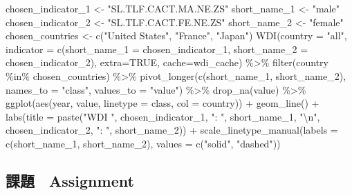 \documentclass[
]{bxjsbook}
\newenvironment{Shaded}{\begin{snugshade}}{\end{snugshade}}
\newcommand{\AttributeTok}[1]{\textcolor[rgb]{0.77,0.63,0.00}{#1}}
\newcommand{\ConstantTok}[1]{\textcolor[rgb]{0.00,0.00,0.00}{#1}}
\newcommand{\FunctionTok}[1]{\textcolor[rgb]{0.00,0.00,0.00}{#1}}
\newcommand{\NormalTok}[1]{#1}
\newcommand{\OtherTok}[1]{\textcolor[rgb]{0.56,0.35,0.01}{#1}}
\newcommand{\SpecialCharTok}[1]{\textcolor[rgb]{0.00,0.00,0.00}{#1}}
\newcommand{\StringTok}[1]{\textcolor[rgb]{0.31,0.60,0.02}{#1}}
\theoremstyle{definition}
\theoremstyle{definition}
\theoremstyle{definition}
\theoremstyle{definition}
\theoremstyle{remark}
\begin{document}
\begin{Shaded}
\begin{Highlighting}[]
\NormalTok{chosen\_indicator\_1 }\OtherTok{\textless{}{-}} \StringTok{"SL.TLF.CACT.MA.NE.ZS"}
\NormalTok{short\_name\_1 }\OtherTok{\textless{}{-}} \StringTok{"male"}
\NormalTok{chosen\_indicator\_2 }\OtherTok{\textless{}{-}} \StringTok{"SL.TLF.CACT.FE.NE.ZS"}
\NormalTok{short\_name\_2 }\OtherTok{\textless{}{-}} \StringTok{"female"}
\NormalTok{chosen\_countries }\OtherTok{\textless{}{-}} \FunctionTok{c}\NormalTok{(}\StringTok{"United States"}\NormalTok{, }\StringTok{"France"}\NormalTok{, }\StringTok{"Japan"}\NormalTok{)}
\FunctionTok{WDI}\NormalTok{(}\AttributeTok{country =} \StringTok{"all"}\NormalTok{, }\AttributeTok{indicator =} \FunctionTok{c}\NormalTok{(}\AttributeTok{short\_name\_1 =}\NormalTok{ chosen\_indicator\_1, }\AttributeTok{short\_name\_2 =}\NormalTok{ chosen\_indicator\_2), }\AttributeTok{extra=}\ConstantTok{TRUE}\NormalTok{, }\AttributeTok{cache=}\NormalTok{wdi\_cache) }\SpecialCharTok{\%\textgreater{}\%} 
  \FunctionTok{filter}\NormalTok{(country }\SpecialCharTok{\%in\%}\NormalTok{ chosen\_countries) }\SpecialCharTok{\%\textgreater{}\%} 
  \FunctionTok{pivot\_longer}\NormalTok{(}\FunctionTok{c}\NormalTok{(short\_name\_1, short\_name\_2), }\AttributeTok{names\_to =} \StringTok{"class"}\NormalTok{, }\AttributeTok{values\_to =} \StringTok{"value"}\NormalTok{) }\SpecialCharTok{\%\textgreater{}\%} \FunctionTok{drop\_na}\NormalTok{(value) }\SpecialCharTok{\%\textgreater{}\%}
  \FunctionTok{ggplot}\NormalTok{(}\FunctionTok{aes}\NormalTok{(year, value, }\AttributeTok{linetype =}\NormalTok{ class, }\AttributeTok{col =}\NormalTok{ country)) }\SpecialCharTok{+} \FunctionTok{geom\_line}\NormalTok{() }\SpecialCharTok{+}
  \FunctionTok{labs}\NormalTok{(}\AttributeTok{title =} \FunctionTok{paste}\NormalTok{(}\StringTok{"WDI "}\NormalTok{, chosen\_indicator\_1, }\StringTok{": "}\NormalTok{, short\_name\_1, }\StringTok{"}\SpecialCharTok{\textbackslash{}n}\StringTok{"}\NormalTok{, chosen\_indicator\_2, }\StringTok{": "}\NormalTok{, short\_name\_2)) }\SpecialCharTok{+}
  \FunctionTok{scale\_linetype\_manual}\NormalTok{(}\AttributeTok{labels =} \FunctionTok{c}\NormalTok{(short\_name\_1, short\_name\_2), }\AttributeTok{values =} \FunctionTok{c}\NormalTok{(}\StringTok{"solid"}\NormalTok{, }\StringTok{"dashed"}\NormalTok{))}
\end{Highlighting}
\end{Shaded}

\hypertarget{ux8ab2ux984c-assignment}{%
\subsection{課題　Assignment}\label{ux8ab2ux984c-assignment}}
\end{document}
